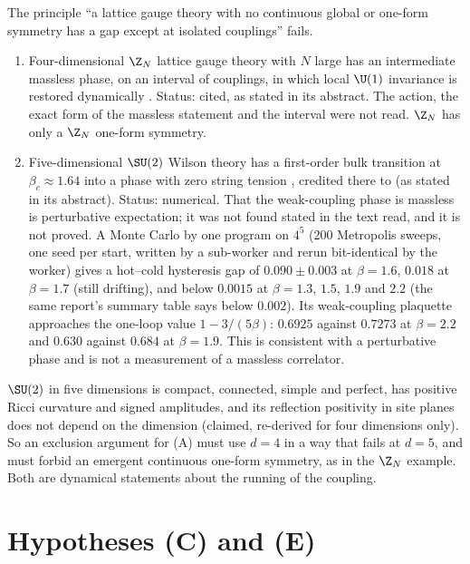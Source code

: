 \begin{observation}\label{neg:obs-excl}
The principle ``a lattice gauge theory with no continuous global or one-form symmetry has a
gap except at isolated couplings'' fails.
\begin{enumerate}
\item Four-dimensional $\Z_N$ lattice gauge theory with $N$ large has an intermediate massless
phase, on an interval of couplings, in which local $\U(1)$ invariance is restored dynamically
\cite{FS82}. Status: cited, as stated in its abstract. The action, the exact form of the
massless statement and the interval were not read. $\Z_N$ has only a $\Z_N$ one-form symmetry.
\item Five-dimensional $\SU(2)$ Wilson theory has a first-order bulk transition at
$\beta_c\approx1.64$ into a phase with zero string tension \cite[\S3 and Fig.~1]{FiveD11},
credited there to \cite{Cr79} (as stated in its abstract). Status: numerical. That the
weak-coupling phase is massless is perturbative expectation; it was not found stated in the
text read, and it is not proved. A Monte Carlo by one program on $4^5$ (200 Metropolis sweeps,
one seed per start, written by a sub-worker and rerun bit-identical by the worker) gives a
hot--cold hysteresis gap of $0.090\pm0.003$ at $\beta=1.6$, $0.018$ at $\beta=1.7$ (still
drifting), and below $0.0015$ at $\beta=1.3$, $1.5$, $1.9$ and $2.2$ (the same report's summary
table says below $0.002$). Its weak-coupling plaquette approaches the one-loop value
$1-3/(5\beta)$: $0.6925$ against $0.7273$ at $\beta=2.2$ and $0.630$ against $0.684$ at
$\beta=1.9$. This is consistent with a perturbative phase and is not a measurement of a massless
correlator.
\end{enumerate}
$\SU(2)$ in five dimensions is compact, connected, simple and perfect, has positive Ricci
curvature and signed amplitudes, and its reflection positivity in site planes does not depend on
the dimension (claimed, re-derived for four dimensions only). So an exclusion argument for (A)
must use $d=4$ in a way that fails at $d=5$, and must forbid an emergent continuous one-form
symmetry, as in the $\Z_N$ example. Both are dynamical statements about the running of the
coupling.
\end{observation}

\section{Hypotheses (C) and (E)}\label{sec:CE}

